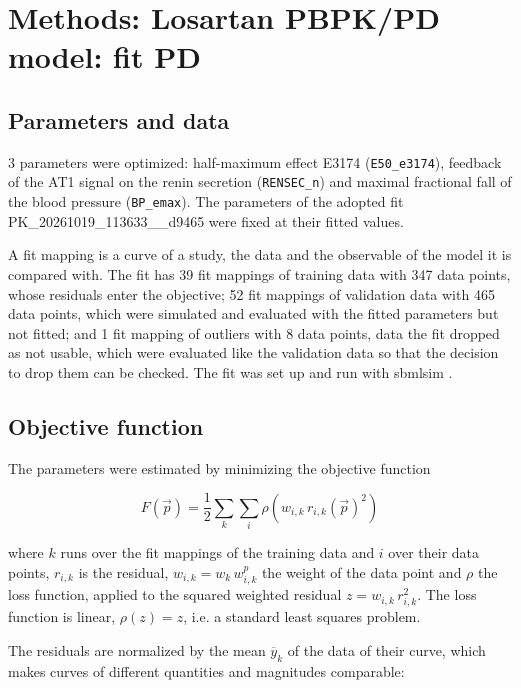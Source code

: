 \section{Methods: Losartan PBPK/PD model: fit PD}

\subsection{Parameters and data}

3 parameters were optimized: half-maximum effect E3174 (\texttt{E50\_e3174}), feedback of the AT1 signal on the renin secretion (\texttt{RENSEC\_n}) and maximal fractional fall of the blood pressure (\texttt{BP\_emax}). The parameters of the adopted fit PK\_20261019\_113633\_\_d9465 were fixed at their fitted values.

A fit mapping is a curve of a study, the data and the observable of the model it is compared with. The fit has 39 fit mappings of training data with 347 data points, whose residuals enter the objective; 52 fit mappings of validation data with 465 data points, which were simulated and evaluated with the fitted parameters but not fitted; and 1 fit mapping of outliers with 8 data points, data the fit dropped as not usable, which were evaluated like the validation data so that the decision to drop them can be checked. The fit was set up and run with sbmlsim \cite{Koenig2026_sbmlsim}.

\subsection{Objective function}

The parameters were estimated by minimizing the objective function

\begin{equation}
F(\vec{p}) = \frac{1}{2} \sum_{k} \sum_{i} \rho\left(w_{i,k}\, r_{i,k}(\vec{p})^2\right)
\end{equation}

where $k$ runs over the fit mappings of the training data and $i$ over their data points, $r_{i,k}$ is the residual, $w_{i,k} = w_k\, w^{p}_{i,k}$ the weight of the data point and $\rho$ the loss function, applied to the squared weighted residual $z = w_{i,k}\, r_{i,k}^2$. The loss function is linear, $\rho(z) = z$, i.e. a standard least squares problem.

The residuals are normalized by the mean $\overline{y}_k$ of the data of their curve, which makes curves of different quantities and magnitudes comparable:

